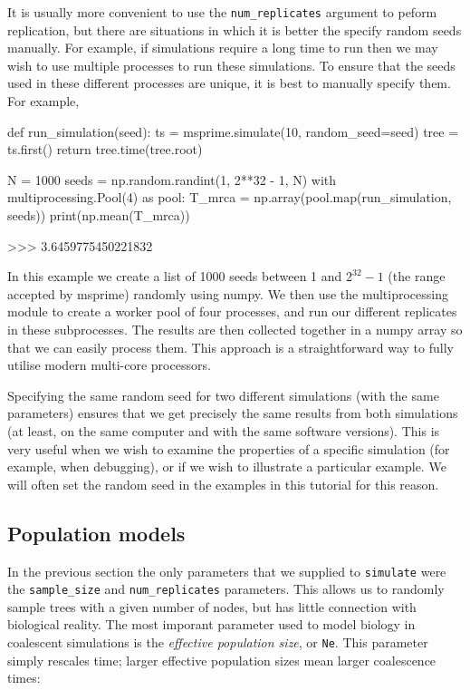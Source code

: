 \documentclass[graybox]{svmult}
\begin{document}
It is usually more convenient to use the \texttt{num\_replicates}
argument to peform replication, but there are situations in which it is
better the specify random seeds manually. For example, if simulations
require a long time to run then we may wish to use multiple processes to
run these simulations. To ensure that the seeds used in these different
processes are unique, it is best to manually specify them. For example,

\begin{pythoncode}
def run_simulation(seed):
    ts = msprime.simulate(10, random_seed=seed)
    tree = ts.first()
    return tree.time(tree.root)

N = 1000
seeds = np.random.randint(1, 2**32 - 1, N)
with multiprocessing.Pool(4) as pool:
    T_mrca = np.array(pool.map(run_simulation, seeds))
print(np.mean(T_mrca))

>>> 3.6459775450221832
\end{pythoncode}

    In this example we create a list of 1000 seeds between 1 and $2^{32} -
1$ (the range accepted by msprime) randomly using numpy. We then use the
multiprocessing module to create a worker pool of four processes, and
run our different replicates in these subprocesses. The results are then
collected together in a numpy array so that we can easily process them.
This approach is a straightforward way to fully utilise modern
multi-core processors.

Specifying the same random seed for two different simulations (with the
same parameters) ensures that we get precisely the same results from
both simulations (at least, on the same computer and with the same
software versions). This is very useful when we wish to examine the
properties of a specific simulation (for example, when debugging), or if
we wish to illustrate a particular example. We will often set the random
seed in the examples in this tutorial for this reason.

\subsection{Population models}\label{population-models}

In the previous section the only parameters that we supplied to
\texttt{simulate} were the \texttt{sample\_size} and
\texttt{num\_replicates} parameters. This allows us to randomly sample
trees with a given number of nodes, but has little connection with
biological reality. The most imporant parameter used to model biology in
coalescent simulations is the \emph{effective population size}, or
\texttt{Ne}. This parameter simply rescales time; larger effective
population sizes mean larger coalescence times:
\end{document}
